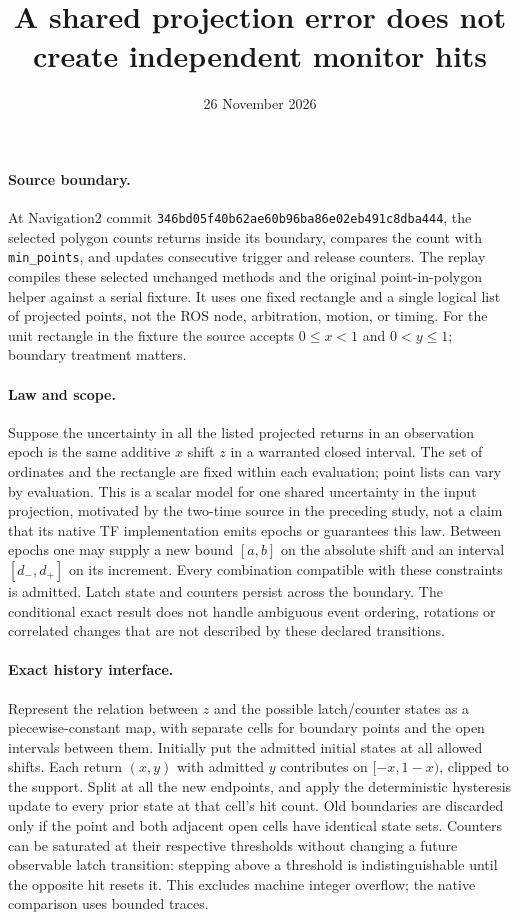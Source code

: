 \documentclass[11pt]{article}
\title{A shared projection error does not create independent monitor hits}
\date{26 November 2026}
\begin{document}
\maketitle

\paragraph{Source boundary.}
At Navigation2 commit \texttt{346bd05f40b62ae60b96ba86e02eb491c8dba444},
the selected polygon counts returns inside its boundary, compares
the count with \texttt{min\_points}, and updates consecutive trigger
and release counters. The replay compiles these selected unchanged
methods and the original point-in-polygon helper against a serial
fixture. It uses one fixed rectangle and a single logical list of
projected points, not the ROS node, arbitration, motion, or timing.
For the unit rectangle in the fixture the source accepts
$0\leq x<1$ and $0<y\leq1$; boundary treatment matters.

\paragraph{Law and scope.}
Suppose the uncertainty in all the listed projected returns in an
observation epoch is the same additive $x$ shift $z$ in a warranted
closed interval. The set of ordinates and the rectangle are fixed
within each evaluation; point lists can vary by evaluation. This is
a scalar model for one shared uncertainty in the input projection,
motivated by the two-time source in the preceding study, not a claim
that its native TF implementation emits epochs or guarantees this law.
Between epochs one may supply a new bound $[a,b]$ on the absolute
shift and an interval $[d_-,d_+]$ on its increment. Every combination
compatible with these constraints is admitted. Latch state and
counters persist across the boundary. The conditional exact result
does not handle ambiguous event ordering, rotations or correlated
changes that are not described by these declared transitions.

\paragraph{Exact history interface.}
Represent the relation between $z$ and the possible latch/counter
states as a piecewise-constant map, with separate cells for boundary
points and the open intervals between them. Initially put the
admitted initial states at all allowed shifts. Each return $(x,y)$
with admitted $y$ contributes on $[-x,1-x)$, clipped to the support.
Split at all the new endpoints, and apply the deterministic
hysteresis update to every prior state at that cell's hit count.
Old boundaries are discarded only if the point and both adjacent
open cells have identical state sets. Counters can be saturated at
their respective thresholds without changing a future observable
latch transition: stepping above a threshold is indistinguishable
until the opposite hit resets it. This excludes machine integer
overflow; the native comparison uses bounded traces.
\end{document}
